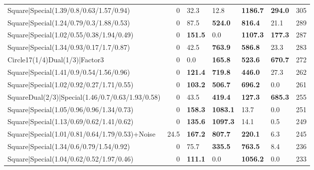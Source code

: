 \begin{tabular}{lrllllr}
 Square|Special(1.39/0.8/0.63/1.57/0.94)                       &             0   & 32.3           & 12.8            & \textbf{1186.7} & \textbf{294.0}  &          305 \\
 Square|Special(1.24/0.79/0.3/1.88/0.53)                       &             0   & 87.5           & \textbf{524.0}  & \textbf{816.4}  & 21.1            &          289 \\
 Square|Special(1.02/0.55/0.38/1.94/0.49)                      &             0   & \textbf{151.5} & 0.0             & \textbf{1107.3} & \textbf{177.3}  &          287 \\
 Square|Special(1.34/0.93/0.17/1.7/0.87)                       &             0   & 42.5           & \textbf{763.9}  & \textbf{586.8}  & 23.3            &          283 \\
 Circle17(1/4)Dual(1/3)|Factor3                                &             0   & 0.0            & \textbf{165.8}  & \textbf{523.6}  & \textbf{670.7}  &          272 \\
 Square|Special(1.41/0.9/0.54/1.56/0.96)                       &             0   & \textbf{121.4} & \textbf{719.8}  & \textbf{446.0}  & 27.3            &          262 \\
 Square|Special(1.02/0.92/0.27/1.71/0.55)                      &             0   & \textbf{103.2} & \textbf{506.7}  & \textbf{696.2}  & 0.0             &          261 \\
 SquareDual(2/3)|Special(1.46/0.7/0.63/1.93/0.58)              &             0   & 43.5           & \textbf{419.4}  & \textbf{127.3}  & \textbf{685.3}  &          255 \\
 Square|Special(1.05/0.96/0.96/1.34/0.73)                      &             0   & \textbf{158.3} & \textbf{1083.1} & 13.7            & 0.0             &          251 \\
 Square|Special(1.13/0.69/0.62/1.41/0.62)                      &             0   & \textbf{135.6} & \textbf{1097.3} & 14.1            & 0.5             &          249 \\
 Square|Special(1.01/0.81/0.64/1.79/0.53)+Noise                &            24.5 & \textbf{167.2} & \textbf{807.7}  & \textbf{220.1}  & 6.3             &          245 \\
 Square|Special(1.34/0.6/0.79/1.54/0.92)                       &             0   & 75.7           & \textbf{335.5}  & \textbf{763.5}  & 8.4             &          236 \\
 Square|Special(1.04/0.62/0.52/1.97/0.46)                      &             0   & \textbf{111.1} & 0.0             & \textbf{1056.2} & 0.0             &          233 \\

\end{tabular}
